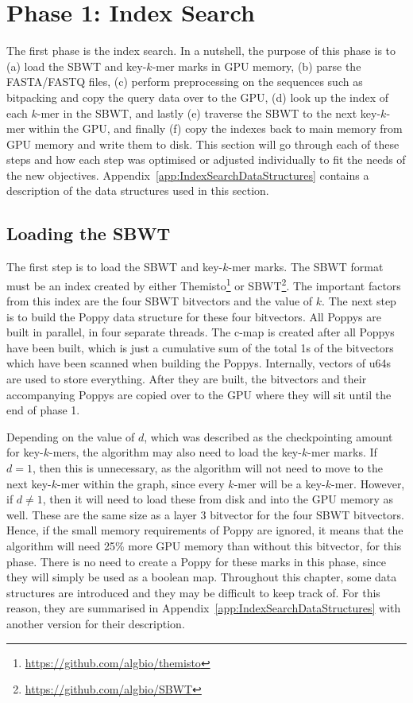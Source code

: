\section{Phase 1: Index Search}\label{sec:Phase1}

The first phase is the index search.
In a nutshell, the purpose of this phase is to (a) load the SBWT and key-$k$-mer marks in GPU memory, (b) parse the FASTA/FASTQ files, (c) perform preprocessing on the sequences such as bitpacking and copy the query data over to the GPU, (d) look up the index of each $k$-mer in the SBWT, and lastly (e) traverse the SBWT to the next key-$k$-mer within the GPU, and finally (f) copy the indexes back to main memory from GPU memory and write them to disk.
This section will go through each of these steps and how each step was optimised or adjusted individually to fit the needs of the new objectives.
Appendix~\ref{app:IndexSearchDataStructures} contains a description of the data structures used in this section.


\subsection{Loading the SBWT}

The first step is to load the SBWT and key-$k$-mer marks.
The SBWT format must be an index created by either Themisto\footnote{\url{https://github.com/algbio/themisto}} or SBWT\footnote{\url{https://github.com/algbio/SBWT}}.
The important factors from this index are the four SBWT bitvectors and the value of $k$.
The next step is to build the Poppy data structure for these four bitvectors.
All Poppys are built in parallel, in four separate threads.
The c-map is created after all Poppys have been built, which is just a cumulative sum of the total 1s of the bitvectors which have been scanned when building the Poppys.
Internally, vectors of u64s are used to store everything.
After they are built, the bitvectors and their accompanying Poppys are copied over to the GPU where they will sit until the end of phase 1.

Depending on the value of $d$, which was described as the checkpointing amount for key-$k$-mers, the algorithm may also need to load the key-$k$-mer marks.
If $d=1$, then this is unnecessary, as the algorithm will not need to move to the next key-$k$-mer within the graph, since every $k$-mer will be a key-$k$-mer.
However, if $d \ne 1$, then it will need to load these from disk and into the GPU memory as well.
These are the same size as a layer 3 bitvector for the four SBWT bitvectors.
Hence, if the small memory requirements of Poppy are ignored, it means that the algorithm will need 25\% more GPU memory than without this bitvector, for this phase.
There is no need to create a Poppy for these marks in this phase, since they will simply be used as a boolean map.
Throughout this chapter, some data structures are introduced and they may be difficult to keep track of.
For this reason, they are summarised in Appendix~\ref{app:IndexSearchDataStructures} with another version for their description.

